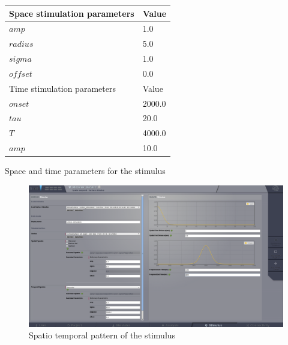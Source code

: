 \documentclass{tufte-handout}
\begin{document}
\begin{margintable}
  \centering
  \selectfont
  \begin{tabular}{ll}
    \toprule
    Space stimulation parameters & Value \\
    \midrule
             $amp$          &   1.0  \\
             $radius$          &  5.0   \\
             $sigma$           &   1.0        \\
             $offset$           &   0.0   \\
    \midrule
    \midrule
    Time stimulation parameters & Value \\
    \midrule
             $onset$          &   2000.0 \\
             $tau$          &  20.0   \\
             $T$           &   4000.0        \\
             $amp$           &   10.0   \\
    \bottomrule
  \end{tabular}
  \caption{Space and time parameters for the stimulus}
  \label{tab:stimtab}
\end{margintable}

\begin{figure}[h]
  \includegraphics[width=\linewidth]{Handout_UI_ModellingAnEpilepticPatient_StimulationSpatioTemporalPattern}%
  \caption{Spatio temporal pattern of the stimulus}%
  \label{fig:stim_st}%
\end{figure}
\end{document}
